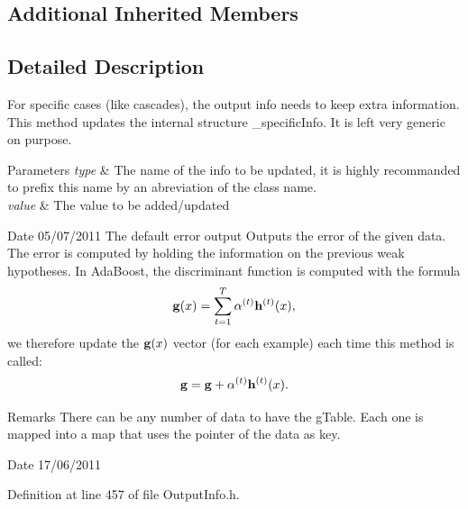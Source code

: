 \subsection*{Additional Inherited Members}


\subsection{Detailed Description}
For specific cases (like cascades), the output info needs to keep extra information. This method updates the internal structure \-\_\-specific\-Info. It is left very generic on purpose. 
\begin{DoxyParams}{Parameters}
{\em type} & The name of the info to be updated, it is highly recommanded to prefix this name by an abreviation of the class name. \\
\hline
{\em value} & The value to be added/updated \\
\hline
\end{DoxyParams}
\begin{DoxyDate}{Date}
05/07/2011 The default error output Outputs the error of the given data. The error is computed by holding the information on the previous weak hypotheses. In Ada\-Boost, the discriminant function is computed with the formula \[ {\bf g}(x) = \sum_{t=1}^T \alpha^{(t)} {\bf h}^{(t)}(x), \] we therefore update the ${\bf g}(x)$ vector (for each example) each time this method is called\-: \[ {\bf g} = {\bf g} + \alpha^{(t)} {\bf h}^{(t)}(x). \] 
\end{DoxyDate}
\begin{DoxyRemark}{Remarks}
There can be any number of data to have the g\-Table. Each one is mapped into a map that uses the pointer of the data as key.
\end{DoxyRemark}
\begin{DoxyDate}{Date}
17/06/2011 
\end{DoxyDate}


Definition at line 457 of file Output\-Info.\-h.




